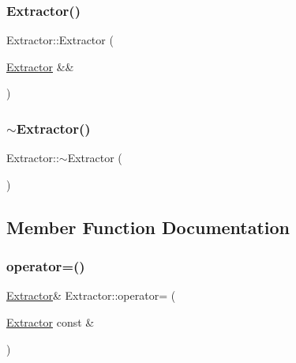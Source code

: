 \subsubsection{\texorpdfstring{Extractor()}{Extractor()}\hspace{0.1cm}{\footnotesize\ttfamily [3/3]}}
{\footnotesize\ttfamily Extractor\+::\+Extractor (\begin{DoxyParamCaption}\item[{\hyperlink{classExtractor}{Extractor} \&\&}]{ }\end{DoxyParamCaption})\hspace{0.3cm}{\ttfamily [delete]}}

\mbox{\label{classExtractor_a0da249c590c92ed0714e8bd69ac236f4}} 
\subsubsection{\texorpdfstring{$\sim$\+Extractor()}{~Extractor()}}
{\footnotesize\ttfamily Extractor\+::$\sim$\+Extractor (\begin{DoxyParamCaption}{ }\end{DoxyParamCaption})}



\subsection{Member Function Documentation}
\mbox{\label{classExtractor_abbc21689d5da9fb8115362a2e262e43f}} 
\subsubsection{\texorpdfstring{operator=()}{operator=()}\hspace{0.1cm}{\footnotesize\ttfamily [1/2]}}
{\footnotesize\ttfamily \hyperlink{classExtractor}{Extractor}\& Extractor\+::operator= (\begin{DoxyParamCaption}\item[{\hyperlink{classExtractor}{Extractor} const \&}]{ }\end{DoxyParamCaption})\hspace{0.3cm}{\ttfamily [delete]}}

